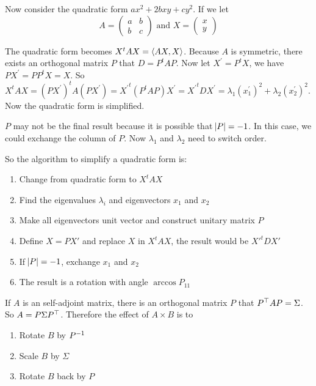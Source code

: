 \begin{example}
    Now consider the quadratic form $ax^2 + 2bxy + cy^2$. If we let 
\begin{equation}
    A = \begin{pmatrix}
        a & b \\
        b & c
    \end{pmatrix} \text{ and } X = \begin{pmatrix}
        x \\
        y
    \end{pmatrix}
\end{equation}

The quadratic form becomes $X^t A X = \innerproduct{AX}{X}$. Because $A$ is symmetric, there exists an orthogonal matrix $P$ that $D = P^t A P$. Now let $X^\prime = P^t X$, we have $PX^\prime = PP^tX = X$. So $X^t A X = (PX^\prime)^t A (PX^\prime) = {X^\prime}^t (P^t A P) X^\prime = {X^\prime}^t D X^\prime = \lambda_1 (x_1^\prime)^2 + \lambda_2 (x_2^\prime)^2$. Now the quadratic form is simplified.

$P$ may not be the final result because it is possible that $\abs{P} = -1$. In this case, we could exchange the column of $P$. Now $\lambda_1$ and $\lambda_2$ need to switch order.

So the algorithm to simplify a quadratic form is:
\begin{enumerate}
    \item Change from quadratic form to $X^t A X$
    \item Find the eigenvalues $\lambda_i$ and eigenvectors $x_1$ and $x_2$
    \item Make all eigenvectors unit vector and construct unitary matrix $P$
    \item Define $X = P X'$ and replace $X$ in $X^t A X$, the result would be $X'^t D X'$
    \item If $\abs{P} = -1$, exchange $x_1$ and $x_2$
    \item The result is a rotation with angle $\arccos P_{11}$
\end{enumerate}
\end{example}

\begin{example}
    If $A$ is an self-adjoint matrix, there is an orthogonal matrix $P$ that ${P}^\top A P = \Sigma$. So $A = P \Sigma {P}^\top$. Therefore the effect of $A \times B$ is to
    \begin{enumerate}
        \item Rotate $B$ by ${P}^{-1}$
        \item Scale $B$ by $\Sigma$
        \item Rotate $B$ back by $P$
    \end{enumerate}
\end{example}



